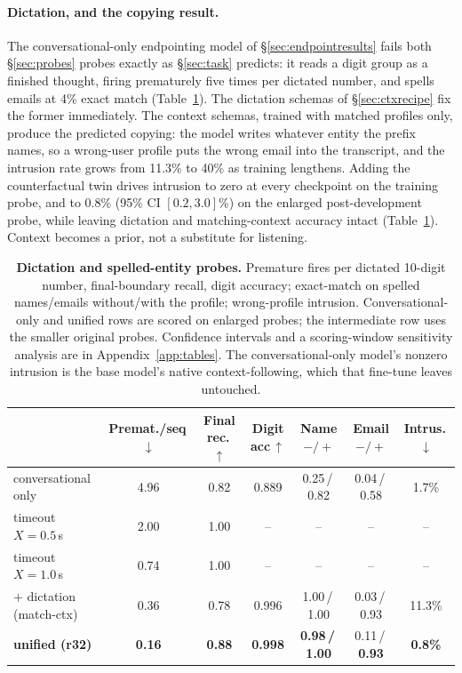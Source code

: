\documentclass[11pt]{article}
\begin{document}
\paragraph{Dictation, and the copying result.} The conversational-only endpointing model of \S\ref{sec:endpointresults} fails both \S\ref{sec:probes} probes exactly as \S\ref{sec:task} predicts: it reads a digit group as a finished thought, firing prematurely five times per dictated number, and spells emails at 4\% exact match (Table~\ref{tab:dictation}). The dictation schemas of \S\ref{sec:ctxrecipe} fix the former immediately. The context schemas, trained with matched profiles only, produce the predicted copying: the model writes whatever entity the prefix names, so a wrong-user profile puts the wrong email into the transcript, and the intrusion rate grows from 11.3\% to 40\% as training lengthens. Adding the counterfactual twin drives intrusion to zero at every checkpoint on the training probe, and to 0.8\% (95\% CI $[0.2,3.0]$\%) on the enlarged post-development probe, while leaving dictation and matching-context accuracy intact (Table~\ref{tab:dictation}). Context becomes a prior, not a substitute for listening.

\begin{table}[t]
  \centering\small
  \caption{\textbf{Dictation and spelled-entity probes.} Premature fires per dictated 10-digit number, final-boundary recall, digit accuracy; exact-match on spelled names/emails without/with the profile; wrong-profile intrusion. Conversational-only and unified rows are scored on enlarged probes; the intermediate row uses the smaller original probes. Confidence intervals and a scoring-window sensitivity analysis are in Appendix~\ref{app:tables}. The conversational-only model's nonzero intrusion is the base model's native context-following, which that fine-tune leaves untouched.}
  \label{tab:dictation}
  \setlength{\tabcolsep}{2.6pt}
  \footnotesize
  \begin{tabular}{lccc|ccc}
    \toprule
    & Premat./seq\,$\downarrow$ & Final rec.\,$\uparrow$ & Digit acc\,$\uparrow$ & Name ${-}/{+}$ & Email ${-}/{+}$ & Intrus.\,$\downarrow$ \\
    \midrule
    conversational only & 4.96 & 0.82 & 0.889 & 0.25\,/\,0.82 & 0.04\,/\,0.58 & 1.7\% \\
    timeout $X{=}0.5$\,s & 2.00 & 1.00 & -- & -- & -- & -- \\
    timeout $X{=}1.0$\,s & 0.74 & 1.00 & -- & -- & -- & -- \\
    $+$ dictation (match-ctx) & 0.36 & 0.78 & 0.996 & 1.00\,/\,1.00 & 0.03\,/\,0.93 & 11.3\% \\
    \textbf{unified (r32)} & \textbf{0.16} & \textbf{0.88} & \textbf{0.998} & \textbf{0.98\,/\,1.00} & 0.11\,/\,\textbf{0.93} & \textbf{0.8\%} \\
    \bottomrule
  \end{tabular}
\end{table}
\end{document}
